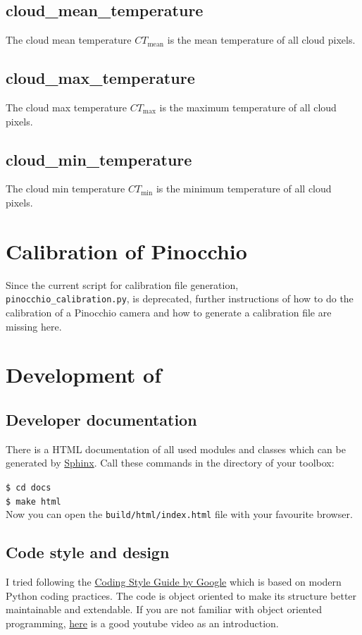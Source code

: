 \documentclass[11pt,a4paper]{article}
\begin{document}
\subsection{cloud\_mean\_temperature}
The cloud mean temperature $CT_\text{mean}$ is the mean temperature of all cloud pixels.

\subsection{cloud\_max\_temperature}
The cloud max temperature $CT_\text{max}$ is the maximum temperature of all cloud pixels.

\subsection{cloud\_min\_temperature}
The cloud min temperature $CT_\text{min}$ is the minimum temperature of all cloud pixels.

\section{Calibration of Pinocchio}
\label{sec:calibration}
Since the current script for calibration file generation, \texttt{pinocchio\_calibration.py}, is deprecated, further instructions of how to do the calibration of a Pinocchio camera and how to generate a calibration file are missing here.

\section{Development of \cloud}
\label{sec:development}

\subsection{Developer documentation}
There is a HTML documentation of all used modules and classes which can be generated by \href{http://www.sphinx-doc.org/en/stable/install.html}{Sphinx}. Call these commands in the directory of your \cloud toolbox:

\texttt{\$ cd docs}\\
\texttt{\$ make html}\\

Now you can open the \texttt{build/html/index.html} file with your favourite browser.

\subsection{Code style and design}
I tried following the \href{https://google.github.io/styleguide/pyguide.html}{Coding Style Guide by Google}  which is based on modern Python coding practices. The code is object oriented to make its structure better maintainable and extendable. If you are not familiar with object oriented programming, \href{https://www.youtube.com/watch?v=ZDa-Z5JzLYM}{here} is a good youtube video as an introduction.\\
\end{document}
